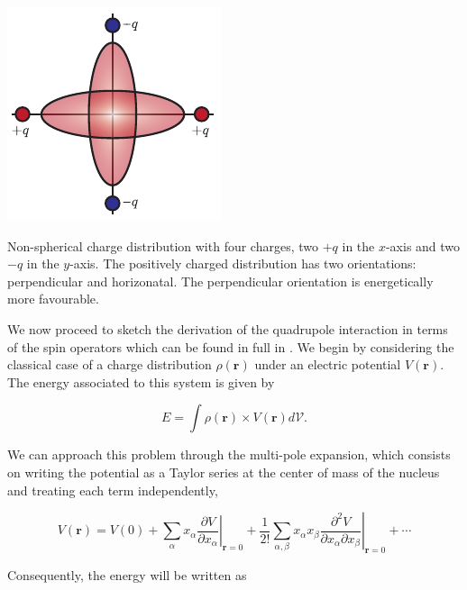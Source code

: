 \begin{marginfigure}
    \includegraphics{chapter2/figures/charge_orientatons.pdf}
    \caption[Quadrupole charge diagram]{Non-spherical charge distribution with four charges, two $+q$ in the $x$-axis and two $-q$ in the $y$-axis. The positively charged distribution has two orientations: perpendicular and horizonatal. The perpendicular orientation is energetically more favourable.}
\end{marginfigure}

We now proceed to sketch the derivation of the quadrupole interaction in terms of the spin operators which can be found in full in . We begin by considering the classical case of a charge distribution $\rho(\mathbf{r})$ under an electric potential $V(\mathbf{r})$. The energy associated to this system is given by

\begin{equation}
    E = \int \rho(\mathbf{r}) \times V(\mathbf{r}) d\mathcal{V}.
\end{equation}

We can approach this problem through the multi-pole expansion, which consists on writing the potential as a Taylor series at the center of mass of the nucleus and treating each term independently, 

\begin{equation}
V(\mathbf{r}) = V(0) 
+ \sum_{\alpha} x_{\alpha} 
\left. \frac{\partial V}{\partial x_{\alpha}} \right|_{\mathbf{r}=0}
+ \frac{1}{2!} \sum_{\alpha,\beta} x_{\alpha} x_{\beta} 
\left. \frac{\partial^2 V}{\partial x_{\alpha} \partial x_{\beta}} \right|_{\mathbf{r}=0}
+ \cdots
\end{equation}

Consequently, the energy will be written as 

